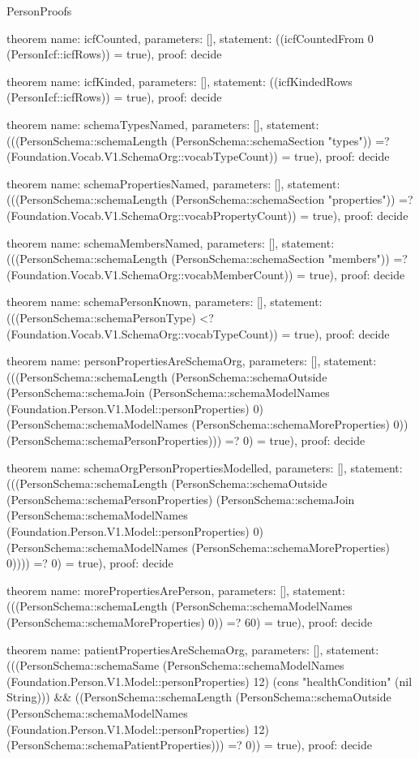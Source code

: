 \begin{lexlean}{PersonProofs}
\begin{semanticmodule}
theorem{
  name: icfCounted,
  parameters: [],
  statement: ((icfCountedFrom 0 (PersonIcf::icfRows)) = true),
  proof: decide{}
}

theorem{
  name: icfKinded,
  parameters: [],
  statement: ((icfKindedRows (PersonIcf::icfRows)) = true),
  proof: decide{}
}

theorem{
  name: schemaTypesNamed,
  parameters: [],
  statement: (((PersonSchema::schemaLength (PersonSchema::schemaSection "types")) =? (Foundation.Vocab.V1.SchemaOrg::vocabTypeCount)) = true),
  proof: decide{}
}

theorem{
  name: schemaPropertiesNamed,
  parameters: [],
  statement: (((PersonSchema::schemaLength (PersonSchema::schemaSection "properties")) =? (Foundation.Vocab.V1.SchemaOrg::vocabPropertyCount)) = true),
  proof: decide{}
}

theorem{
  name: schemaMembersNamed,
  parameters: [],
  statement: (((PersonSchema::schemaLength (PersonSchema::schemaSection "members")) =? (Foundation.Vocab.V1.SchemaOrg::vocabMemberCount)) = true),
  proof: decide{}
}

theorem{
  name: schemaPersonKnown,
  parameters: [],
  statement: (((PersonSchema::schemaPersonType) <? (Foundation.Vocab.V1.SchemaOrg::vocabTypeCount)) = true),
  proof: decide{}
}

theorem{
  name: personPropertiesAreSchemaOrg,
  parameters: [],
  statement: (((PersonSchema::schemaLength (PersonSchema::schemaOutside (PersonSchema::schemaJoin (PersonSchema::schemaModelNames (Foundation.Person.V1.Model::personProperties) 0) (PersonSchema::schemaModelNames (PersonSchema::schemaMoreProperties) 0)) (PersonSchema::schemaPersonProperties))) =? 0) = true),
  proof: decide{}
}

theorem{
  name: schemaOrgPersonPropertiesModelled,
  parameters: [],
  statement: (((PersonSchema::schemaLength (PersonSchema::schemaOutside (PersonSchema::schemaPersonProperties) (PersonSchema::schemaJoin (PersonSchema::schemaModelNames (Foundation.Person.V1.Model::personProperties) 0) (PersonSchema::schemaModelNames (PersonSchema::schemaMoreProperties) 0)))) =? 0) = true),
  proof: decide{}
}

theorem{
  name: morePropertiesArePerson,
  parameters: [],
  statement: (((PersonSchema::schemaLength (PersonSchema::schemaModelNames (PersonSchema::schemaMoreProperties) 0)) =? 60) = true),
  proof: decide{}
}

theorem{
  name: patientPropertiesAreSchemaOrg,
  parameters: [],
  statement: (((PersonSchema::schemaSame (PersonSchema::schemaModelNames (Foundation.Person.V1.Model::personProperties) 12) (cons "healthCondition" (nil String))) && ((PersonSchema::schemaLength (PersonSchema::schemaOutside (PersonSchema::schemaModelNames (Foundation.Person.V1.Model::personProperties) 12) (PersonSchema::schemaPatientProperties))) =? 0)) = true),
  proof: decide{}
}


\end{semanticmodule}
\end{lexlean}
